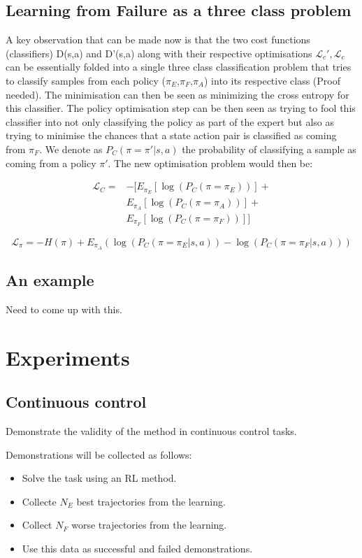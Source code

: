 \documentclass[letterpaper, 10 pt, conference]{ieeeconf}
\begin{document}
\subsection{Learning from Failure as a three class problem}

A key observation that can be made now is that the two cost functions (classifiers) D(s,a) and D'(s,a) along with their respective optimisations $\mathcal{L}_c',\mathcal{L}_c$ 
can be essentially folded into a single three class classification problem that tries to classify samples from each policy ($\pi_E$,$\pi_F$,$\pi_A$) into its respective class (Proof needed). 
The minimisation can then be seen as minimizing the cross entropy for this classifier. The policy optimisation step can be then seen as trying to fool this classifier into not only classifying the policy as part 
of the expert but also as trying to minimise the chances that a state action pair is classified as coming from $\pi_F$. We denote as $P_C(\pi=\pi'|s,a)$ the probability of classifying a sample as coming from a policy $\pi'$. 
The new optimisation problem would then be:

\begin{align}
    \mathcal{L}_C = & -\Big[ E_{\pi_E}[\log(P_C(\pi=\pi_E))] +\\ &E_{\pi_A}[\log(P_C(\pi=\pi_A))] +\\ &E_{\pi_F}[\log(P_C(\pi=\pi_F))]\Big]  
\end{align}

\begin{equation}
      \mathcal{L_\pi} = -H(\pi) + E_{\pi_A}(\log(P_C(\pi=\pi_E|s,a)) - \log(P_C(\pi=\pi_F|s,a))) 
\end{equation}

\subsection{An example}

Need to come up with this. 

\section{Experiments}

\subsection{Continuous control}
Demonstrate the validity of the method in continuous control tasks.

Demonstrations will be collected as follows:
\begin{itemize}
 \item Solve the task using an RL method.
 \item Collecte $N_E$ best trajectories from the learning.
 \item Collect $N_F$ worse trajectories from the learning. 
 \item Use this data as successful and failed demonstrations.
\end{itemize}
\end{document}

